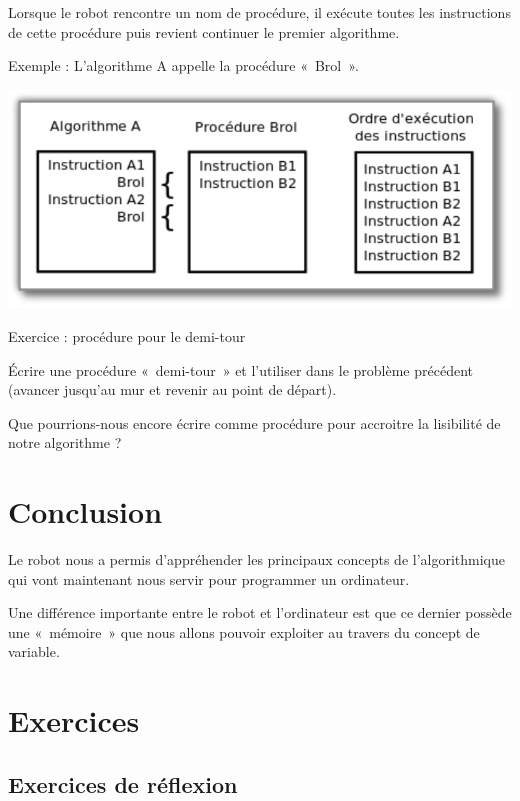 	Lorsque le robot rencontre un nom de procédure, il exécute toutes les
	instructions de cette procédure puis revient continuer le premier
	algorithme.

	Exemple : L'algorithme A appelle la procédure «~Brol~».

	\begin{center}
	\includegraphics[width=\textwidth]{image/robot-procedure}
	\end{center}

	\begin{Emphase}{Exercice : procédure pour le demi-tour}
	
		Écrire une procédure «~demi-tour~» et l'utiliser dans
		le problème précédent (avancer jusqu'au mur et revenir
		au point de départ).
		
		Que pourrions-nous encore écrire comme procédure pour accroitre
		la lisibilité de notre algorithme ?

	\end{Emphase}

\section{Conclusion}

	Le robot nous a permis d'appréhender les principaux
	concepts de l'algorithmique qui vont maintenant nous
	servir pour programmer un ordinateur. 
	
	Une différence importante entre le robot et
	l'ordinateur est que ce dernier possède une
	«~mémoire~» que nous allons pouvoir exploiter au travers du concept de
	variable.

\section{Exercices}

	\subsection{Exercices de réflexion}

